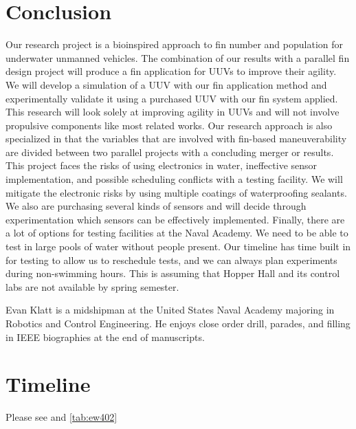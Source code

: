 \documentclass{IEEEtran}
\begin{document}
\section{Conclusion}
Our research project is a bioinspired approach to fin number and population for underwater unmanned vehicles. The combination of our results with a parallel fin design project will produce a fin application for UUVs to improve their agility. We will develop a simulation of a UUV with our fin application method and experimentally validate it using a purchased UUV with our fin system applied. This research will look solely at improving agility in UUVs and will not involve propulsive components like most related works. Our research approach is also specialized in that the variables that are involved with fin-based maneuverability are divided between two parallel projects with a concluding merger or results. This project faces the risks of using electronics in water, ineffective sensor implementation, and possible scheduling conflicts with a testing facility. We will mitigate the electronic risks by using multiple coatings of waterproofing sealants. We also are purchasing several kinds of sensors and will decide through experimentation which sensors can be effectively implemented. Finally, there are a lot of options for testing facilities at the Naval Academy. We need to be able to test in large pools of water without people present. Our timeline has time built in for testing to allow us to reschedule tests, and we can always plan experiments during non-swimming hours. This is assuming that Hopper Hall and its control labs are not available by spring semester.

\nocite{xu2007initial, tangorra2006biorobotic, su2010experimental, geder2013maneuvering, zhou2009dynamics}

\begin{IEEEbiography}{Evan Klatt} is a midshipman at the United States Naval Academy majoring in Robotics and Control Engineering. He enjoys close order drill, parades, and filling in IEEE biographies at the end of manuscripts.  
\end{IEEEbiography}


\appendices
\section{Timeline}
\label{app:A}
Please see  and \ref{tab:ew402}
\end{document}
